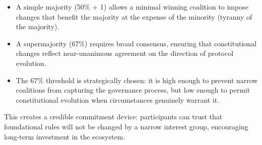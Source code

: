 \begin{itemize}
  \item A simple majority (50\% + 1) allows a minimal winning coalition to
    impose changes that benefit the majority at the expense of the minority
    (tyranny of the majority).
  \item A supermajority (67\%) requires broad consensus, ensuring that
    constitutional changes reflect near-unanimous agreement on the direction
    of protocol evolution.
  \item The 67\% threshold is strategically chosen: it is high enough to
    prevent narrow coalitions from capturing the governance process, but low
    enough to permit constitutional evolution when circumstances genuinely
    warrant it.
\end{itemize}

This creates a credible commitment device: participants can trust that
foundational rules will not be changed by a narrow interest group, encouraging
long-term investment in the ecosystem.
